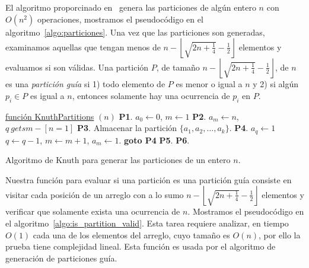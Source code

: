     El algoritmo proporcinado en~\cite{Knuth2011} genera las particiones de algún entero
    $n$ con $O(n^2)$ operaciones, mostramos el pseudocódigo en el
    algoritmo~\ref{algo:particiones}. Una vez que las particiones son generadas,
    examinamos aquellas que tengan menos de $n - \left\lfloor\sqrt{2n + \frac{1}{4}} -
    \frac{1}{2}\right\rfloor$ elementos y evaluamos si son válidas. Una partición $P$, de
    tamaño $n -\left\lfloor\sqrt{2n + \frac{1}{4}} - \frac{1}{2}\right\rfloor$, de $n$ es
    una \emph{partición guía} si 1) todo elemento de $P$ es menor o igual a $n$ y 2) si algún $p_i\in P$ es
    igual a $n$, entonces solamente hay una ocurrencia de $p_i$ en $P$.
    \begin{algorithm}[htpb]
      \DontPrintSemicolon
      \underline{función KnuthPartitions} $(n)$\;
      \textbf{P1}. $a_0 \gets 0$, $m\gets 1$\;
      \textbf{P2}. $a_m \gets n$, $q \ gets m - [n=1]$\;
      \textbf{P3}. Almacenar la partición $\{a_1,a_2,\dots,a_k\}$.\;
      \textbf{P4}. $a_q \gets 1$ $q \gets q-1$, $m \gets m+1$, $a_m \gets 1$.\;
      \textbf{goto P4}\;
      \textbf{P5}. 
      \textbf{P6}. 
      \caption{Algoritmo de Knuth para generar las particiones de un entero $n$.}
      \label{algo:particiones}
    \end{algorithm}

    Nuestra función para evaluar si una partición es una partición guía consiste en visitar
    cada posición de un arreglo con a lo sumo $n - \left\lfloor\sqrt{2n + \frac{1}{4}} -
    \frac{1}{2}\right\rfloor$ elementos y verificar que solamente exista una ocurrencia
    de $n$. Mostramos el pseudocódigo en el algoritmo~\ref{algo:is_partition_valid}. Esta tarea
    requiere analizar, en tiempo $O(1)$ cada una de los elementos del arreglo, cuyo tamaño es
    $O(n)$, por ello la prueba tiene complejidad lineal. Esta función es usada por el
    algoritmo de generación de particiones guía.

